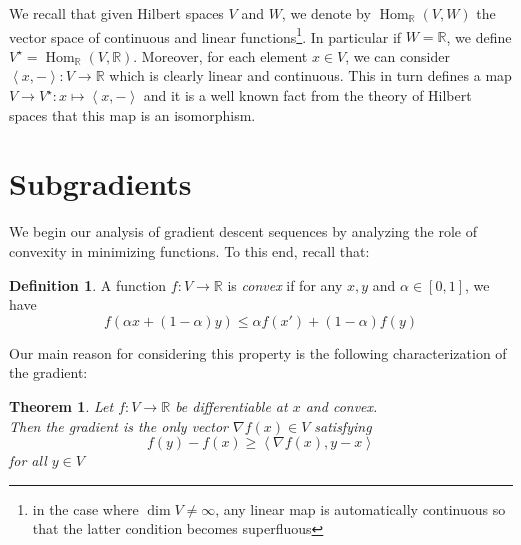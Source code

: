\documentclass{book}
\theoremstyle{plain}
\newtheorem{theorem}[corollary]{Theorem}
\theoremstyle{definition}
\newtheorem{definition}[corollary]{Definition}
\newcommand{\bl}[2]{\left\langle #1,#2\right\rangle}
\renewcommand{\d}[1]{\mathbb{#1}}
\DeclareMathOperator{\Hom}{Hom}
\newcommand{\mor}{\longrightarrow}
\begin{document}
\noindent We recall that given Hilbert spaces $V$ and $W$, we denote by $\Hom_\d{R}(V,W)$ the vector space of continuous and linear functions\footnote{in the case where $\dim V\neq \infty$, any linear map is automatically continuous so that the latter condition becomes superfluous}. In particular if $W=\d{R}$, we define $V^\star=\Hom_{\d{R}}(V,\d{R})$.  Moreover, for each element $x \in V$, we can consider $\bl{x}{-}:V\mor \d{R}$ which is clearly linear and continuous. This in turn defines a map $V\mor V^\star:x\mapsto \bl{x}{-}$ and it is a well known fact from the theory of Hilbert spaces that this map is an isomorphism.\\
\section{Subgradients}
We begin our analysis of gradient descent sequences by analyzing the role of convexity in minimizing functions. To this end, recall that:
\begin{definition}
A function $f:V\mor \d{R}$ is \emph{convex} if for any $x,y$ and $\alpha \in [0,1]$, we have
\[
f(\alpha x+(1-\alpha)y)\le \alpha f(x')+(1-\alpha)f(y)
\]	
\end{definition}

\noindent Our main reason for considering this property is the following characterization of the gradient:
\begin{theorem}\label{thm:gradient=subgradient}
Let $f:V\mor \d{R}$ be differentiable at $x$ and convex.\\
Then the gradient is the only vector $\nabla f(x) \in V$ satisfying
\begin{equation}\label{ineq:subgradient}
f(y)-f(x)\ge \bl{\nabla f(x)}{ y-x}
\end{equation}
for all $y \in V$
\end{theorem}
\end{document}
